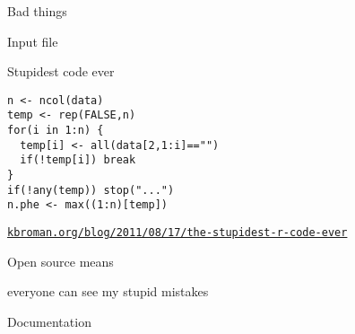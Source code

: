 \documentclass[aspectratio=169,12pt,t]{beamer}
\begin{document}
\begin{frame}{}

\vspace*{16.7mm}

\centerline{\Large Bad things}

\note{
}
\end{frame}


\begin{frame}[c]{Input file}


\note{
}
\end{frame}


\begin{frame}[c,fragile]{Stupidest code ever}

\begin{center}
\begin{minipage}[c]{9.3cm}
\begin{semiverbatim}
\lstset{basicstyle=\normalsize}
\begin{lstlisting}[linewidth=9.3cm]
n <- ncol(data)
temp <- rep(FALSE,n)
for(i in 1:n) {
  temp[i] <- all(data[2,1:i]=="")
  if(!temp[i]) break
}
if(!any(temp)) stop("...")
n.phe <- max((1:n)[temp])
\end{lstlisting}
\end{semiverbatim}
\end{minipage}
\end{center}

\vspace{3mm}

\hfill \href{http://kbroman.org/blog/2011/08/17/the-stupidest-r-code-ever}{\scriptsize \lolit \tt kbroman.org/blog/2011/08/17/the-stupidest-r-code-ever}

\note{
}
\end{frame}


\begin{frame}[c]{}

  \large

  {\hilit Open source} {\lolit means}

  everyone can see my stupid mistakes

  \bigskip \bigskip \bigskip


\note{
}
\end{frame}


\begin{frame}{}

\vspace*{16.7mm}

\centerline{\Large Documentation}

\note{
}
\end{frame}
\end{document}
